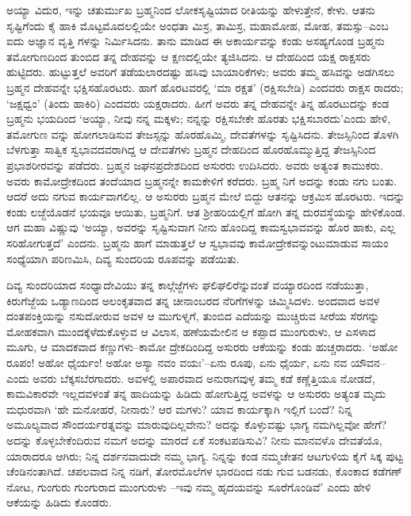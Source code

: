 ಅಯ್ಯಾ ವಿದುರ, ಇನ್ನು ಚತುರ್ಮುಖ ಬ್ರಹ್ಮನಿಂದ ಲೋಕಸೃಷ್ಟಿಯಾದ ರೀತಿಯನ್ನು ಹೇಳುತ್ತೇನೆ, ಕೇಳು. ಆತನು ಸೃಷ್ಟಿಗೆಂದು ಕೈ ಹಾಕಿ ಮೊಟ್ಟಮೊದಲಲ್ಲಿಯೇ ಅಂಧತಾ ಮಿಸ್ರ, ತಾಮಿಸ್ರ, ಮಹಾಮೋಹ, ಮೋಹ, ತಮಸ್ಸು–ಎಂಬ ಐದು ಅಜ್ಞಾನ ವೃತ್ತಿ ಗಳನ್ನು ನಿರ್ಮಿಸಿದನು. ತಾನು ಮಾಡಿದ ಈ ಅಕಾರ್ಯವನ್ನು ಕಂಡು ಅಸಹ್ಯಗೊಂಡ ಬ್ರಹ್ಮನು ತಮೋಗುಣದಿಂದ ತುಂಬಿದ ತನ್ನ ದೇಹವನ್ನು ಆ ಕ್ಷಣದಲ್ಲಿಯೇ ತ್ಯಜಿಸಿದನು. ಆ ದೇಹದಿಂದ ಯಕ್ಷ ರಾಕ್ಷಸರು ಹುಟ್ಟಿದರು. ಹುಟ್ಟುತ್ತಲೆ ಅವರಿಗೆ ತಡೆಯಲಾರದಷ್ಟು ಹಸಿವು ಬಾಯಾರಿಕೆಗಳು; ಅವರು ತಮ್ಮ ಹಸಿವನ್ನು ಅಡಗಿಸಲು ಬ್ರಹ್ಮನ ದೇಹವನ್ನೇ ಭಕ್ಷಿಸಹೊರಟರು. ಹಾಗೆ ಹೊರಟವರಲ್ಲಿ ‘ಮಾ ರಕ್ಷತ’ (ರಕ್ಷಿಸಬೇಡಿ) ಎಂದವರು ರಾಕ್ಷಸ ರಾದರು; ‘ಜಕ್ಷಧ್ವಂ’ (ತಿಂದು ಹಾಕಿರಿ) ಎಂದವರು ಯಕ್ಷರಾದರು. ಹೀಗೆ ಅವರು ತನ್ನ ದೇಹವನ್ನೇ ತಿನ್ನ ಹೊರಟುದನ್ನು ಕಂಡ ಬ್ರಹ್ಮನು ಭಯದಿಂದ ‘ಅಯ್ಯಾ, ನೀವು ನನ್ನ ಮಕ್ಕಳು; ನನ್ನನ್ನು ರಕ್ಷಿಸಬೇಕೇ ಹೊರತು ಭಕ್ಷಿಸಬಾರದು’ಎಂದು ಹೇಳಿ, ತಮೋಗುಣ ವನ್ನು ಹೋಗಲಾಡಿಸುವ ತೇಜಸ್ಸನ್ನು ಹೊರಹೊಮ್ಮಿ, ದೇವತೆಗಳನ್ನು ಸೃಷ್ಟಿಸಿದನು. ತೇಜಸ್ಸಿನಿಂದ ತೊಳಗಿ ಬೆಳಗುತ್ತಾ ಸಾತ್ವಿಕ ಸ್ವಭಾವದವರಾಗಿದ್ದ ಆ ದೇವತೆಗಳು ಬ್ರಹ್ಮನ ದೇಹದಿಂದ ಹೊರಹೊಮ್ಮುತ್ತಿದ್ದ ತೇಜಸ್ಸಿನಿಂದ ಪ್ರಭಾಶರೀರವನ್ನು ಪಡೆದರು. ಬ್ರಹ್ಮನ ಜಘನಪ್ರದೇಶದಿಂದ ಅಸುರರು ಉದಿಸಿದರು. ಅವರು ಅತ್ಯಂತ ಕಾಮುಕರು. ಅವರು ಕಾಮೋದ್ರೇಕದಿಂದ ತಂದೆಯಾದ ಬ್ರಹ್ಮನನ್ನೇ ಕಾಮಕೇಳಿಗೆ ಕರೆದರು. ಬ್ರಹ್ಮ ನಿಗೆ ಅದನ್ನು ಕಂಡು ನಗು ಬಂತು. ಆದರೆ ಅದು ನಗುವ ಕಾರ್ಯವಾಗಲಿಲ್ಲ. ಆ ಅಸುರರು ಬ್ರಹ್ಮನ ಮೇಲೆ ಬಿದ್ದು ಆತನನ್ನು ಆಕ್ರಮಿಸ ಹೊರಟರು. ಇದನ್ನು ಕಂಡು ಲಜ್ಜೆಯೊಡನೆ ಭಯವೂ ಆಯಿತು, ಬ್ರಹ್ಮನಿಗೆ. ಆತ ಶ್ರೀಹರಿಯಲ್ಲಿಗೆ ಹೋಗಿ ತನ್ನ ದುರವಸ್ಥೆಯನ್ನು ಹೇಳಿಕೊಂಡ. ಆಗ ಮಹಾ ವಿಷ್ಣುವು ‘ಅಯ್ಯಾ, ಅವರನ್ನು ಸೃಷ್ಟಿಸುವಾಗ ನೀನು ಹೊಂದಿದ್ದ ಕಾಮಸ್ವಭಾವವನ್ನು ಹೊರ ಹಾಕು, ಎಲ್ಲ ಸರಿಹೋಗುತ್ತದೆ’ ಎಂದನು. ಬ್ರಹ್ಮನು ಹಾಗೆ ಮಾಡುತ್ತಲೆ ಆ ಸ್ವಭಾವವು ಕಾಮೋದ್ರೇಕವನ್ನುಂಟುಮಾಡುವ ಸಾಯಂ ಸಂಧ್ಯೆಯಾಗಿ ಪರಿಣಮಿಸಿ, ದಿವ್ಯ ಸುಂದರಿಯ ರೂಪವನ್ನು ಪಡೆಯಿತು.

ದಿವ್ಯ ಸುಂದರಿಯಾದ ಸಂಧ್ಯಾದೇವಿಯು ತನ್ನ ಕಾಲ್ಗೆಜ್ಜೆಗಳು ಘಲಿಘಲಿರೆನ್ನುವಂತೆ ವಯ್ಯಾರದಿಂದ ನಡೆಯುತ್ತಾ, ಕಿರುಗೆಜ್ಜೆಯ ಒಡ್ಯಾಣದಿಂದ ಅಲಂಕೃತವಾದ ತನ್ನ ಚೀನಾಂಬರದ ನೆರಿಗೆಗಳನ್ನು ಚಿಮ್ಮಿಸಿದಳು. ಅಂದವಾದ ಅವಳ ದಂತಪಂಕ್ತಿಯನ್ನು ನಸುದೋರುವ ಅವಳ ಆ ಮುಗುಳ್ನಗೆ, ತುಂಬಿದ ಎದೆಯನ್ನು ಮುಚ್ಚಿರುವ ಸೀರೆಯ ಸೆರಗನ್ನು ಮೋಹಕವಾಗಿ ಮುಂದಕ್ಕೆಳೆದುಕೊಳ್ಳುವ ಆ ವಿಲಾಸ, ಹಣೆಯಮೇಲಿನ ಆ ಕಪ್ಪಾದ ಮುಂಗುರುಳು, ಆ ಎಸಳಾದ ಮೂಗು, ಆ ಮಾದಕವಾದ ಕಣ್ಣುಗಳು–ಕಾಮೋ ದ್ರೇಕದಿಂದಿದ್ದ ಅಸುರರು ಆಕೆಯನ್ನು ಕಂಡು ಹುಚ್ಚರಾದರು. ‘ಅಹೋ ರೂಪಂ! ಅಹೋ ಧೈರ್ಯಂ! ಅಹೋ ಅಸ್ಯಾ ನವಂ ವಯಃ’–ಏನು ರೂಪು, ಏನು ಧೈರ್ಯ, ಏನು ನವ ಯೌವನ–ಎಂದು ಅವರು ಬೆಕ್ಕಸಬೆರಗಾದರು. ಅವಳಲ್ಲಿ ಅಪಾರವಾದ ಅನುರಾಗವುಳ್ಳ ತಮ್ಮ ಕಡೆ ಕಣ್ಣೆತ್ತಿಯೂ ನೋಡದೆ, ಕಾಮವಿಕಾರವೇ ಇಲ್ಲದವಳಂತೆ ತನ್ನ ಹಾದಿಯನ್ನು ಹಿಡಿದು ಹೋಗುತ್ತಿದ್ದ ಅವಳನ್ನು ಆ ಅಸುರರು ಅತ್ಯಂತ ಮೃದು ಮಧುರವಾಗಿ ‘ಹೇ ಮನೋಹರೆ, ನೀನಾರು? ಆರ ಮಗಳು? ಯಾವ ಕಾರ್ಯಕ್ಕಾಗಿ ಇಲ್ಲಿಗೆ ಬಂದೆ? ನಿನ್ನ ಅಮೂಲ್ಯವಾದ ಸೌಂದರ್ಯರತ್ನವನ್ನು ಮಾರುವುದಿಲ್ಲವೇನು? ಅದನ್ನು ಕೊಳ್ಳುವಷ್ಟು ಭಾಗ್ಯ ನಮಗಿಲ್ಲವೋ ಹೇಗೆ? ಅದನ್ನು ಕೊಳ್ಳಬೇಕೆಂದಿರುವ ನಮಗೆ ಅದನ್ನು ಮಾರದೆ ಏಕೆ ಸಂಕಟಪಡಿಸುವಿ? ನೀನು ಮಾನವಳೊ ದೇವತೆಯೊ, ಯಾರಾದರೂ ಆಗಿರು; ನಿನ್ನ ದರ್ಶನವಾದುದೇ ನಮ್ಮ ಭಾಗ್ಯ. ನಿನ್ನನ್ನು ಕಂಡ ನಮ್ಮಚೇತನ ಆಟಗುಳಿಯ ಕೈಗೆ ಸಿಕ್ಕ ಪುಟ್ಟ ಚೆಂಡಿನಂತಾಗಿದೆ. ಚಪಲವಾದ ನಿನ್ನ ನಡಿಗೆ, ತೋರಮೊಲೆಗಳ ಭಾರದಿಂದ ನಡು ಗುವ ಬಡನಡು, ಕೊಂಕಾದ ಕಡೆಗಣ್ ನೋಟ, ಗುಂಗುರು ಗುಂಗುರಾದ ಮುಂಗುರುಳು –ಇವು ನಮ್ಮ ಹೃದಯವನ್ನು ಸೂರೆಗೊಂಡಿವೆ’ ಎಂದು ಹೇಳಿ ಆಕೆಯನ್ನು ಹಿಡಿದು ಕೊಂಡರು.

